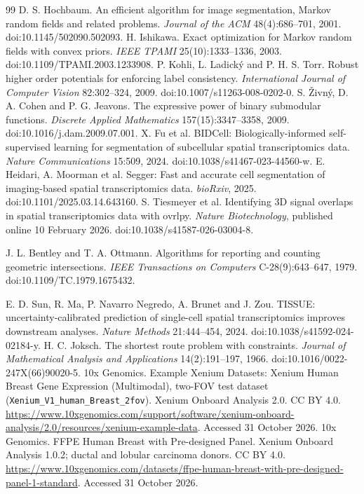\begin{thebibliography}{99}
 D. S. Hochbaum. An efficient algorithm for image segmentation, Markov random fields and related problems. \emph{Journal of the ACM} 48(4):686--701, 2001. doi:10.1145/502090.502093.
 H. Ishikawa. Exact optimization for Markov random fields with convex priors. \emph{IEEE TPAMI} 25(10):1333--1336, 2003. doi:10.1109/TPAMI.2003.1233908.
 P. Kohli, L. Ladick\'y and P. H. S. Torr. Robust higher order potentials for enforcing label consistency. \emph{International Journal of Computer Vision} 82:302--324, 2009. doi:10.1007/s11263-008-0202-0.
 S. \v{Z}ivn\'y, D. A. Cohen and P. G. Jeavons. The expressive power of binary submodular functions. \emph{Discrete Applied Mathematics} 157(15):3347--3358, 2009. doi:10.1016/j.dam.2009.07.001.
 X. Fu et al. BIDCell: Biologically-informed self-supervised learning for segmentation of subcellular spatial transcriptomics data. \emph{Nature Communications} 15:509, 2024. doi:10.1038/s41467-023-44560-w.
 E. Heidari, A. Moorman et al. Segger: Fast and accurate cell segmentation of imaging-based spatial transcriptomics data. \emph{bioRxiv}, 2025. doi:10.1101/2025.03.14.643160.
 S. Tiesmeyer et al. Identifying 3D signal overlaps in spatial transcriptomics data with ovrlpy. \emph{Nature Biotechnology}, published online 10 February 2026. doi:10.1038/s41587-026-03004-8.

 J. L. Bentley and T. A. Ottmann. Algorithms for reporting and counting geometric intersections. \emph{IEEE Transactions on Computers} C-28(9):643--647, 1979. doi:10.1109/TC.1979.1675432.

 E. D. Sun, R. Ma, P. Navarro Negredo, A. Brunet and J. Zou. TISSUE: uncertainty-calibrated prediction of single-cell spatial transcriptomics improves downstream analyses. \emph{Nature Methods} 21:444--454, 2024. doi:10.1038/s41592-024-02184-y.
 H. C. Joksch. The shortest route problem with constraints. \emph{Journal of Mathematical Analysis and Applications} 14(2):191--197, 1966. doi:10.1016/0022-247X(66)90020-5.
 10x Genomics. Example Xenium Datasets: Xenium Human Breast Gene Expression (Multimodal), two-FOV test dataset (\nolinkurl{Xenium_V1_human_Breast_2fov}). Xenium Onboard Analysis 2.0. CC BY 4.0. \url{https://www.10xgenomics.com/support/software/xenium-onboard-analysis/2.0/resources/xenium-example-data}. Accessed 31 October 2026.
 10x Genomics. FFPE Human Breast with Pre-designed Panel. Xenium Onboard Analysis 1.0.2; ductal and lobular carcinoma donors. CC BY 4.0. \url{https://www.10xgenomics.com/datasets/ffpe-human-breast-with-pre-designed-panel-1-standard}. Accessed 31 October 2026.
\end{thebibliography}
